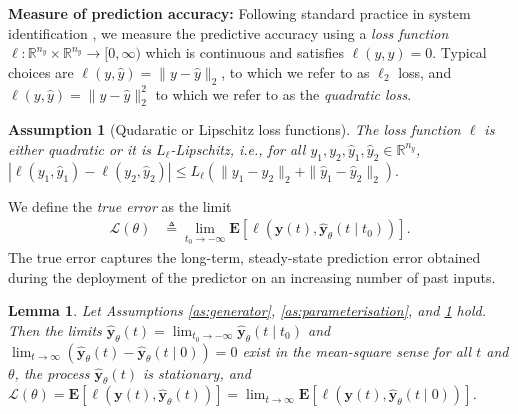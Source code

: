 \documentclass{article}
\def\rvu{{\mathbf{i}}}
\def\rvu{{\mathbf{u}}}
\def\rvy{{\mathbf{y}}}
\newtheorem{lemma}[theorem]{Lemma}
\newtheorem{assumption}[theorem]{Assumption}
\newcommand{\y}{\mathbf{y}}
\newcommand{\bE}{\mathbf{E}}
\begin{document}
\textbf{Measure of prediction accuracy:} 
Following standard practice in system identification \cite{LjungBook}, we measure the predictive accuracy
using a \emph{loss function}
$\ell: \mathbb{R}^{n_y} \times \mathbb{R}^{n_y} \rightarrow [0,\infty)$
which is continuous and satisfies $\ell(y,y)=0$.
Typical choices are 
  $\ell(y,\hat{y})=\|y-\hat{y}\|_{2}$, to which we refer to as $\ell_2$ loss,
  and 
    \( \ell(y,\hat{y})=\|y-\hat{y}\|_2^2 \) to which we refer to as the \emph{quadratic loss}. 
\begin{assumption}[Qudaratic or Lipschitz loss functions]
\label{as:loss}
 The loss function $\ell$ is either quadratic or it is $L_{\ell}$-Lipschitz, i.e., for all $y_1,y_2,\hat{y}_1,\hat{y}_2 \in \mathbb{R}^{n_y}$,
\( |\ell(y_1,\hat{y}_1)-\ell(y_2,\hat{y}_2)| \le L_{\ell} (\|y_1-y_2\|_2+\|\hat{y}_1-\hat{y}_2\|_2). \)
\end{assumption}
We define the \emph{true error} as the limit
\begin{align}
\mathcal{L}(\theta) &\triangleq\lim_{t_0 \rightarrow -\infty} \bE[\ell(\y(t),\hat{\rvy}_\theta(t\mid t_0))]. \label{eq:GenLoss}
\end{align}  
The true error captures the long-term, steady-state prediction error obtained during the deployment of the predictor on an increasing number of past inputs.
\begin{lemma}\label{l:ihp} Let Assumptions \ref{as:generator}, \ref{as:parameterisation}, and \ref{as:loss} hold.
Then the limits 
	\( \hat{\rvy}_\theta(t)=\lim_{t_0 \rightarrow -\infty} \hat{\rvy}_\theta(t\mid t_0) \)
  and $\lim_{t \rightarrow \infty} (\hat{\rvy}_{\theta}(t)-\hat{\rvy}_{\theta}(t \mid 0))=0$
	exist in the mean-square sense for all $t$ and $\theta$, the process $\hat{\rvy}_\theta(t)$ is stationary, and 
	\(	\mathcal{L}(\theta)=\bE[\ell(\y(t),\hat{\rvy}_\theta(t) )]=\lim_{t \rightarrow \infty} \bE[\ell(\y(t),\hat{\rvy}_\theta(t\mid 0))]\). 
\end{lemma}
\end{document}
